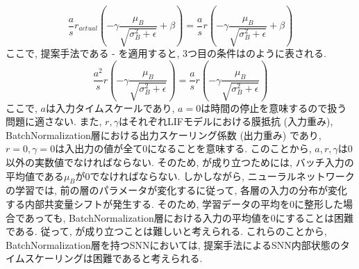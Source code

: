 \begin{equation}
    \frac{a}{s} r_{actual} \left(-\gamma \frac{\mu_B}{\sqrt{\sigma_B^2+\epsilon}} +\beta\right)  = \frac{a}{s} r \left(-\gamma \frac{\mu_B}{\sqrt{\sigma_B^2+\epsilon}} +\beta\right)  
    \label{eq:batchnormalization:lif:approximation:condition3}
\end{equation}
ここで, 提案手法である - を適用すると, 3つ目の条件はのように表される.
\begin{equation}
    \frac{a^2}{s} r \left(-\gamma \frac{\mu_B}{\sqrt{\sigma_B^2+\epsilon}}\right)  = \frac{a}{s} r \left(-\gamma \frac{\mu_B}{\sqrt{\sigma_B^2+\epsilon}}\right)  
    \label{eq:batchnormalization:lif:approximation:condition3:result}
\end{equation}
ここで, $a$は入力タイムスケールであり, $a=0$は時間の停止を意味するので扱う問題に適さない.
また, $r, \gamma$はそれぞれLIFモデルにおける膜抵抗 (入力重み), BatchNormalization層における出力スケーリング係数 (出力重み) であり, $r=0, \gamma=0$は入出力の値が全て0になることを意味する.
このことから, $a, r, \gamma$は0以外の実数値でなければならない.
そのため, が成り立つためには, バッチ入力の平均値である$\mu_B$が0でなければならない.
しかしながら, ニューラルネットワークの学習では, 前の層のパラメータが変化するに従って, 各層の入力の分布が変化する内部共変量シフトが発生する\cite{batchnorm}.
そのため, 学習データの平均を0に整形した場合であっても, BatchNormalization層における入力の平均値を0にすることは困難である.
従って, が成り立つことは難しいと考えられる.
これらのことから, BatchNormalization層を持つSNNにおいては, 提案手法によるSNN内部状態のタイムスケーリングは困難であると考えられる.
